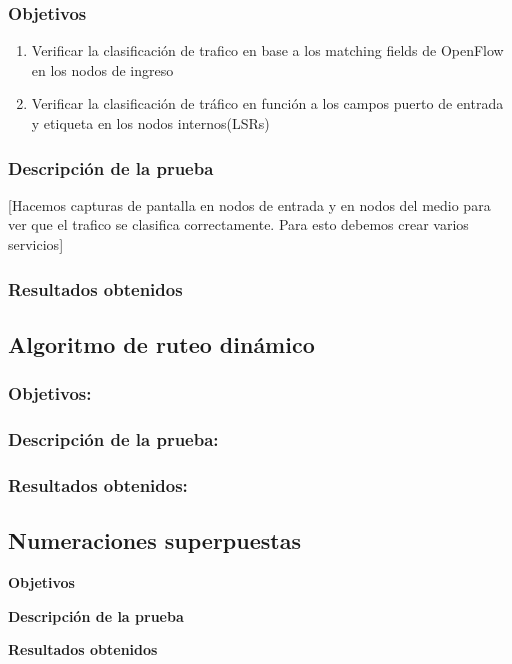 \subsubsection{Objetivos}
\begin{enumerate}
\item Verificar la clasificación de trafico en base a los matching fields de OpenFlow en los nodos de ingreso
\item Verificar la clasificación de tr\'afico en función a los campos puerto de entrada y etiqueta en los nodos internos(LSRs)
\end{enumerate}

\subsubsection{Descripción de la prueba}
[Hacemos capturas de pantalla en nodos de entrada y en nodos del medio para ver que el trafico se clasifica correctamente. Para esto debemos crear varios servicios]

\subsubsection{Resultados obtenidos}

\subsection{Algoritmo de ruteo dinámico}

\subsubsection{Objetivos:}


\subsubsection{Descripción de la prueba:}


\subsubsection{Resultados obtenidos:}


\subsection{Numeraciones superpuestas}

\textbf{Objetivos}

\textbf{Descripción de la prueba}

\textbf{Resultados obtenidos}